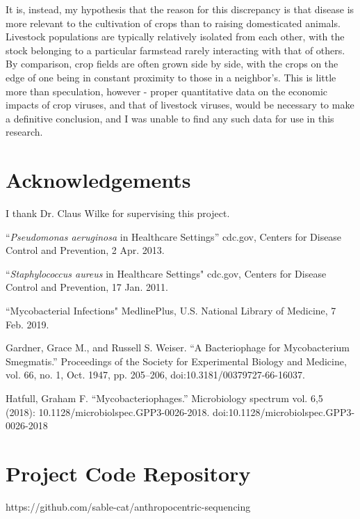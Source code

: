 \documentclass[12pt]{article}
\begin{document}
    It is, instead, my hypothesis that the reason for this discrepancy is that
    disease is more relevant to the cultivation of crops than to raising
    domesticated animals. Livestock populations are typically relatively
    isolated from each other, with the stock belonging to a particular
    farmstead rarely interacting with that of others. By comparison, crop fields
    are often grown side by side, with the crops on the edge of one being in
    constant proximity to those in a neighbor's. This is little more than
    speculation, however - proper quantitative data on the economic impacts of
    crop viruses, and that of livestock viruses, would be necessary to make
    a definitive conclusion, and I was unable to find any such data for use
    in this research.

    \section{Acknowledgements}

    I thank Dr. Claus Wilke for supervising this project.

    \begin{thebibliography}{}

        “\emph{Pseudomonas aeruginosa} in Healthcare Settings” cdc.gov, Centers for Disease Control and Prevention, 2 Apr. 2013.
        
        “\emph{Staphylococcus aureus} in Healthcare Settings" cdc.gov, Centers for Disease Control and Prevention, 17 Jan. 2011.

        “Mycobacterial Infections" MedlinePlus, U.S. National Library of Medicine, 7 Feb. 2019.

        Gardner, Grace M., and Russell S. Weiser. “A Bacteriophage for Mycobacterium Smegmatis.” Proceedings of the Society for Experimental Biology and Medicine, vol. 66, no. 1, Oct. 1947, pp. 205–206, doi:10.3181/00379727-66-16037.
        
        Hatfull, Graham F. “Mycobacteriophages.” Microbiology spectrum vol. 6,5 (2018): 10.1128/microbiolspec.GPP3-0026-2018. doi:10.1128/microbiolspec.GPP3-0026-2018

    \end{thebibliography}

    \appendix

    \section{Project Code Repository}
    https://github.com/sable-cat/anthropocentric-sequencing
\end{document}
